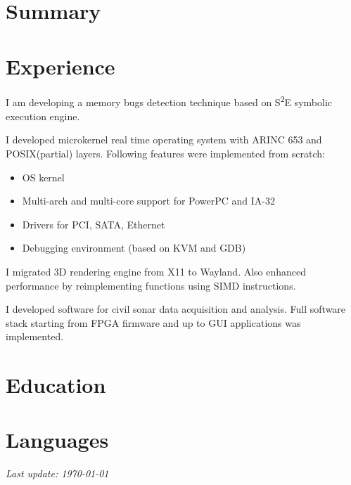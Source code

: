 \documentclass[11pt, a4paper]{moderncv}
\begin{document}
\makecvtitle



\section{Summary}





\section{Experience}

{
  I am developing a memory bugs detection technique based on S\textsuperscript{2}E symbolic execution engine.
}

{
  I developed microkernel real time operating system with ARINC 653 and POSIX(partial) layers.
  Following features were implemented from scratch:
    \begin{itemize}
    \item OS kernel
    \item Multi-arch and multi-core support for PowerPC and IA-32
    \item Drivers for PCI, SATA, Ethernet
    \item Debugging environment (based on KVM and GDB)
    \end{itemize}
}

{
  I migrated 3D rendering engine from X11 to Wayland.
  Also enhanced performance by reimplementing functions using SIMD instructions.
}

{
  I developed software for civil sonar data acquisition and analysis.
  Full software stack starting from FPGA firmware and up to GUI applications was implemented.
}



\section{Education}




\section{Languages}



\vfill
\begin{flushright}\textit{Last update: \today}\end{flushright}
\end{document}
